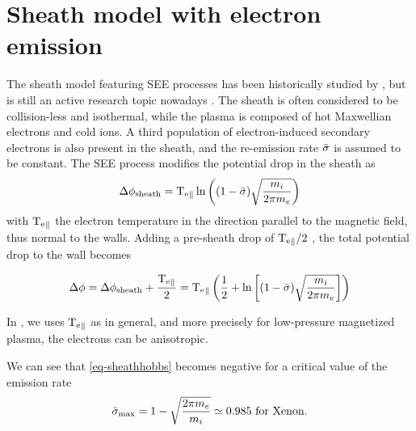 
\section{Sheath model with electron emission}
  \label{sec-sheath}
  
  
  The sheath model featuring SEE processes has been historically studied by \citet{hobbs1967}, but is still an active research topic nowadays \citep{ahedo2005}.
  The sheath is often considered to be collision-less and isothermal, while the plasma is composed of hot Maxwellian electrons and cold ions. A third population of electron-induced secondary electrons is also present in the sheath, and the re-emission rate $ \bar{\sigma }$ is assumed to be constant.
  The SEE process modifies the potential drop in the sheath as \citep{hobbs1967}
  \begin{equation} \label{eq-sheathhobbs}
    \Delta \phi_{\rm sheath} = \mathrm{T_e}_{\parallel} \ln \left( (1 -  \bar{\sigma }) \sqrt{\frac{m_i}{2 \pi m_e}}   \right)
  \end{equation}
  with $\mathrm{T_e}_{\parallel}$ the electron temperature in the direction parallel to the magnetic field, thus normal to the walls.
  Adding a pre-sheath drop of $\mathrm{T_e}_{\parallel}/2$ \citep{ahedo2002}, the total potential drop to the wall becomes
  
  \begin{equation} \label{eq-total_drop}
    \Delta \phi = \Delta \phi_{\rm sheath} + \frac{\mathrm{T_e}_{\parallel}}{2} =  \mathrm{T_e}_{\parallel} \left( \frac{1}{2} + \ln \left[ (1 -  \bar{\sigma }) \sqrt{\frac{m_i}{2 \pi m_e}}   \right]  \right)
  \end{equation}
  
  In , we uses $\mathrm{T_e}_{\parallel}$ as in general, and more precisely for low-pressure magnetized plasma, the electrons can be anisotropic.
  
  We can see that \cref{eq-sheathhobbs} becomes negative for a critical value of the emission rate
  \begin{equation} \label{eq-ratecrone}
     \bar{\sigma }_{\rm max} = 1 - \sqrt{\frac{2 \pi m_e}{m_i}} \simeq 0.985 \text{ for Xenon.}
  \end{equation}
  
